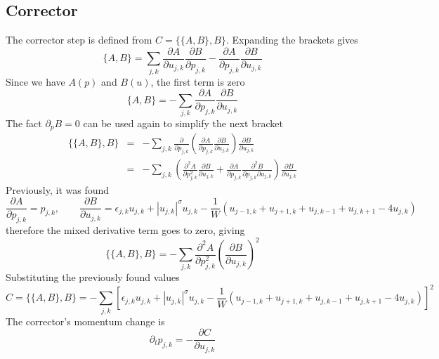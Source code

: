 \documentclass[12pt, a4paper, prl]{revtex4}
\newcommand{\abs}[1]{\left| #1 \right|}
\begin{document}
\subsection{Corrector}
The corrector step is defined from $C = \{\{A,B\},B\}$. Expanding the brackets gives
\begin{equation*}
\{A,B\} = \sum_{j,k} \frac{\partial A}{\partial u_{j,k}}\frac{\partial B}{\partial p_{j,k}} -
\frac{\partial A}{\partial p_{j,k}}\frac{\partial B}{\partial u_{j,k}} 
\end{equation*}
Since we have $A(p)$ and $B(u)$, the first term is zero
\begin{equation*}
\{A,B\}  = - \sum_{j,k} 
\frac{\partial A}{\partial p_{j,k}}\frac{\partial B}{\partial u_{j,k}}
\end{equation*}
The fact $\partial_p B = 0$ can be used again to simplify the next bracket
\begin{eqnarray*}
\{\{A,B\}, B\} &=& - \sum_{j,k} 
\frac{\partial}{\partial p_{j,k}}\left(\frac{\partial A}{\partial p_{j,k}}\frac{\partial B}{\partial u_{j,k}} \right)
\frac{\partial B}{\partial u_{j,k}} \\
&=&  - \sum_{j,k} 
\left(\frac{\partial^2 A}{\partial p_{j,k}^2}\frac{\partial B}{\partial u_{j,k}} + 
\frac{\partial A}{\partial p_{j,k}}\frac{\partial^2 B}{\partial p_{j,k} \partial u_{j,k}} \right)
\frac{\partial B}{\partial u_{j,k}}
\end{eqnarray*}
Previously, it was found
\begin{equation*}
\frac{\partial A}{\partial p_{j,k}} = p_{j,k}, \qquad
\frac{\partial B}{\partial u_{j,k}} =\epsilon_{j,k} u_{j,k} + \abs{u_{j,k}}^\sigma u_{j,k} - \frac{1}{W}\left( u_{j-1,k} + u_{j+1,k} + u_{j,k-1} + u_{j,k+1} - 4u_{j,k} \right) 
\end{equation*}
therefore the mixed derivative term goes to zero, giving
\begin{equation*}
 \{\{A,B\}, B\} = - \sum_{j,k} \frac{\partial^2 A}{\partial p_{j,k}^2}\left(\frac{\partial B}{\partial u_{j,k}}  
 \right)^2 
 \end{equation*}
 Substituting the previously found values
 \begin{equation*}
  C =\{\{A,B\}, B\} = - \sum_{j,k}  \left[
  \epsilon_{j,k} u_{j,k} + \abs{u_{j,k}}^\sigma u_{j,k} - \frac{1}{W}\left( u_{j-1,k} + u_{j+1,k} + u_{j,k-1} + u_{j,k+1} - 4u_{j,k} \right) 
  \right]^2
\end{equation*}
The corrector's momentum change is 
\begin{equation*}
\partial_t p_{j,k} = -\frac{\partial C}{\partial u_{j,k}}
\end{equation*}
\end{document}
